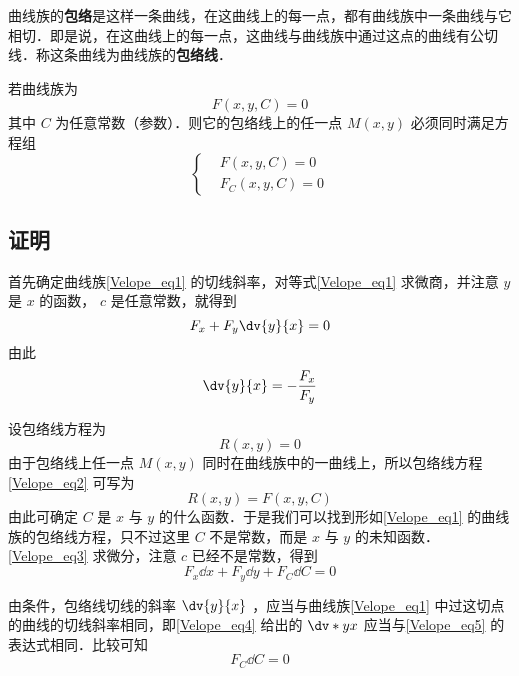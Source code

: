 曲线族的\textbf{包络}是这样一条曲线，在这曲线上的每一点，都有曲线族中一条曲线与它相切．即是说，在这曲线上的每一点，这曲线与曲线族中通过这点的曲线有公切线．称这条曲线为曲线族的\textbf{包络线}．

若曲线族为 
\begin{equation}\label{Velope_eq1}
F(x,y,C)=0
\end{equation}
其中 $C$ 为任意常数（参数）．则它的包络线上的任一点 $M(x,y)$ 必须同时满足方程组
\begin{equation}\label{Velope_eq6}
\left\{\begin{aligned}
&F(x,y,C)=0\\
&F_C(x,y,C)=0
\end{aligned}\right.
\end{equation}
\subsection{证明}
首先确定曲线族\autoref{Velope_eq1} 的切线斜率，对等式\autoref{Velope_eq1} 求微商，并注意 $y$ 是 $x$ 的函数， $c$ 是任意常数，就得到
\begin{equation}
F_x+F_y\dv{y}{x}=0
\end{equation}
由此
\begin{equation}\label{Velope_eq5}
\dv{y}{x}=-\frac{F_x}{F_y}
\end{equation}

设包络线方程为
\begin{equation}\label{Velope_eq2}
R(x,y)=0
\end{equation}
由于包络线上任一点 $M(x,y)$ 同时在曲线族中的一曲线上，所以包络线方程\autoref{Velope_eq2} 可写为
\begin{equation}\label{Velope_eq3}
R(x,y)=F(x,y,C)
\end{equation}
由此可确定 $C$ 是 $x$ 与 $y$ 的什么函数．于是我们可以找到形如\autoref{Velope_eq1} 的曲线族的包络线方程，只不过这里 $C$ 不是常数，而是 $x$ 与 $y$ 的未知函数．\autoref{Velope_eq3} 求微分，注意 $c$ 已经不是常数，得到
\begin{equation}\label{Velope_eq4}
F_x\dd x+F_y\dd y+F_C\dd C=0
\end{equation}

由条件，包络线切线的斜率 $\dv{y}{x}$ ，应当与曲线族\autoref{Velope_eq1} 中过这切点的曲线的切线斜率相同，即\autoref{Velope_eq4} 给出的 $\dv*{y}{x}$ 应当与\autoref{Velope_eq5} 的表达式相同．比较可知
\begin{equation}
F_C\dd C=0
\end{equation}

